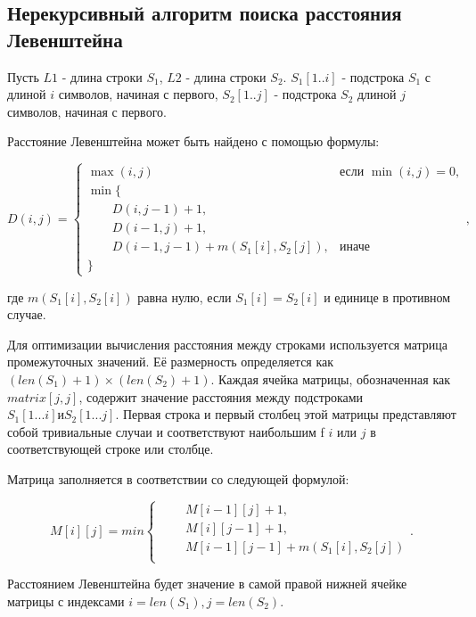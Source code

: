 \subsection{Нерекурсивный алгоритм поиска расстояния Левенштейна}
Пусть $L1$ - длина строки $S_{1}$, $L2$ - длина строки $S_{2}$. 
$S_{1}[1..i]$ - подстрока $S_{1}$ с длиной $i$ символов, начиная с первого, $S_{2}[1..j]$ - подстрока $S_{2}$ длиной $j$ символов, начиная с первого. \cite{levenstein_book}

Расстояние Левенштейна может быть найдено с помощью формулы:

\begin{equation}
	\label{eq:d}
	D(i, j) = \begin{cases} 
		\max(i, j) &\text{если }\min(i, j) = 0, \\
		\min \lbrace \\
	     \qquad D(i, j-1) + 1, \\
	     \qquad D(i-1, j) + 1, \\
	     \qquad D(i-1, j-1) + m(S_{1}[i], S_{2}[j]), &\text{иначе} \\
	     \rbrace
	\end{cases},
\end{equation}

где $m(S_{1}[i], S_{2}[i])$ равна нулю, если $S_{1}[i] = S_{2}[i]$ и единице в противном случае.

Для оптимизации вычисления расстояния между строками используется матрица промежуточных значений. Её размерность определяется как $(len(S_{1}) + 1) × (len(S_{2}) + 1)$.
Каждая ячейка матрицы, обозначенная как $matrix[j, j]$, содержит значение расстояния между подстроками $S_{1}[1...i] и S_{2}[1...j]$. 
Первая строка и первый столбец этой матрицы представляют собой тривиальные случаи и соответствуют наибольшим f $i$ или $j$ в соответствующей строке или столбце.

Матрица заполняется в соответствии со следующей формулой:

\begin{equation}
	\label{eq:mat}
	M[i][j] = min \begin{cases}
		\qquad M[i-1][j] + 1,\\
		\qquad M[i][j-1] + 1,\\
		\qquad M[i-1][j-1] + m(S_{1}[i], S_{2}[j])\\
	\end{cases}.
\end{equation}

Расстоянием Левенштейна будет значение в самой правой нижней ячейке матрицы с индексами $i = len(S_{1}), j = len(S_{2})$.

